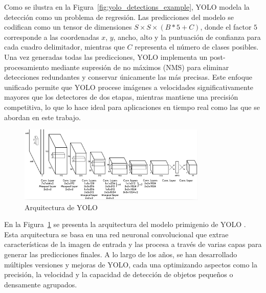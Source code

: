 \documentclass[11pt,spanish,listoffigures,listoftables]{tfgetsinf}
\begin{document}
Como se ilustra en la Figura~\ref{fig:yolo_detections_example}\cite{redmon2016lookonceunifiedrealtime}, YOLO modela la detección como un problema de regresión. Las predicciones del modelo se codifican como un tensor de dimensiones $S \times S \times (B * 5 + C)$, donde el factor $5$ corresponde a las coordenadas $x$, $y$, ancho, alto y la puntuación de confianza para cada cuadro delimitador, mientras que $C$ representa el número de clases posibles. Una vez generadas todas las predicciones, YOLO implementa un post-procesamiento mediante supresión de no máximos (NMS) para eliminar detecciones redundantes y conservar únicamente las más precisas. Este enfoque unificado permite que YOLO procese imágenes a velocidades significativamente mayores que los detectores de dos etapas, mientras mantiene una precisión competitiva, lo que lo hace ideal para aplicaciones en tiempo real como las que se abordan en este trabajo.

\begin{figure}[H]
   \centering
   \includegraphics[width=0.8\textwidth]{images/estado_del_arte/yolo_architecture.png}
   \caption{Arquitectura de YOLO}
   \label{fig:yolo_architecture}
\end{figure}

En la Figura~\ref{fig:yolo_architecture} se presenta la arquitectura del modelo primigenio de YOLO \cite{redmon2016lookonceunifiedrealtime}. Esta arquitectura se basa en una red neuronal convolucional que extrae características de la imagen de entrada y las procesa a través de varias capas para generar las predicciones finales. A lo largo de los años, se han desarrollado múltiples versiones y mejoras de YOLO, cada una optimizando aspectos como la precisión, la velocidad y la capacidad de detección de objetos pequeños o densamente agrupados.
\end{document}
